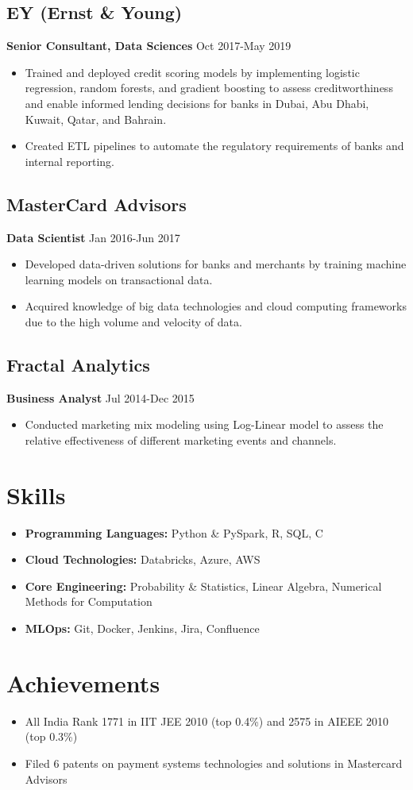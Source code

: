 \documentclass[a4paper,10pt]{article}
\begin{document}
\subsection*{EY (Ernst \& Young)}
\textbf{Senior Consultant, Data Sciences} \hfill Oct 2017-May 2019
\begin{itemize}[leftmargin=*]
    \item Trained and deployed credit scoring models by implementing logistic regression, random forests, and gradient boosting to assess creditworthiness and enable informed lending decisions for banks in Dubai, Abu Dhabi, Kuwait, Qatar, and Bahrain.
    \item Created ETL pipelines to automate the regulatory requirements of banks and internal reporting.
\end{itemize}

\subsection*{MasterCard Advisors}
\textbf{Data Scientist} \hfill Jan 2016-Jun 2017
\begin{itemize}[leftmargin=*]
    \item Developed data-driven solutions for banks and merchants by training machine learning models on transactional data.
    \item Acquired knowledge of big data technologies and cloud computing frameworks due to the high volume and velocity of data.
\end{itemize}

\subsection*{Fractal Analytics}
\textbf{Business Analyst} \hfill Jul 2014-Dec 2015
\begin{itemize}[leftmargin=*]
    \item Conducted marketing mix modeling using Log-Linear model to assess the relative effectiveness of different marketing events and channels.
\end{itemize}

\section*{Skills}
\begin{itemize}[leftmargin=*]
    \item \textbf{Programming Languages:} Python \& PySpark, R, SQL, C
    \item \textbf{Cloud Technologies:} Databricks, Azure, AWS
    \item \textbf{Core Engineering:} Probability \& Statistics, Linear Algebra, Numerical Methods for Computation
    \item \textbf{MLOps:} Git, Docker, Jenkins, Jira, Confluence
\end{itemize}

\section*{Achievements}
\begin{itemize}[leftmargin=*]
    \item All India Rank 1771 in IIT JEE 2010 (top 0.4\%) and 2575 in AIEEE 2010 (top 0.3\%)
    \item Filed 6 patents on payment systems technologies and solutions in Mastercard Advisors
\end{itemize}
\end{document}
